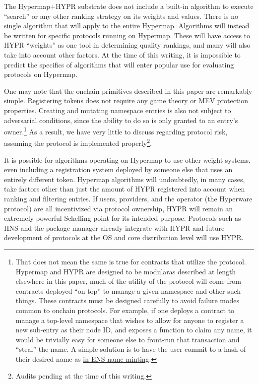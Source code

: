 \documentclass[runningheads]{llncs}
\begin{document}
The Hypermap+HYPR substrate does not include a built-in algorithm to execute ``search'' or any other ranking strategy on its weights and values.
There is no single algorithm that will apply to the entire Hypermap.
Algorithms will instead be written for specific protocols running on Hypermap.
These will have access to HYPR ``weights'' as one tool in determining quality rankings, and many will also take into account other factors.
At the time of this writing, it is impossible to predict the specifics of algorithms that will enter popular use for evaluating protocols on Hypermap.

One may note that the onchain primitives described in this paper are remarkably simple.
Registering tokens does not require any game theory or MEV protection properties.
Creating and mutating namespace entries is also not subject to adversarial conditions, since the ability to do so is only granted to an entry's owner.\footnote{That does not mean the same is true for contracts that utilize the protocol.
Hypermap and HYPR are designed to be modular\textemdash as described at length elsewhere in this paper, much of the utility of the protocol will come from contracts deployed ``on top'' to manage a given namespace and other such things.
These contracts must be designed carefully to avoid failure modes common to onchain protocols.
For example, if one deploys a contract to manage a top-level namespace that wishes to allow for anyone to register a new sub-entry as their node ID, and exposes a function to claim any name, it would be trivially easy for someone else to front-run that transaction and ``steal'' the name.
A simple solution is to have the user commit to a hash of their desired name as \href{https://docs.ens.domains/registry/eth\#commit-reveal}{in ENS name minting}.}
As a result, we have very little to discuss regarding protocol risk, assuming the protocol is implemented properly\footnote{Audits pending at the time of this writing.}.

It is possible for algorithms operating on Hypermap to use other weight systems, even including a registration system deployed by someone else that uses an entirely different token.
Hypermap algorithms will undoubtedly, in many cases, take factors other than just the amount of HYPR registered into account when ranking and filtering entries.
If users, providers, and the operator (the Hyperware protocol) are all incentivized via protocol ownership, HYPR will remain an extremely powerful Schelling point for its intended purpose.
Protocols such as HNS and the package manager already integrate with HYPR and future development of protocols at the OS and core distribution level will use HYPR.
\end{document}
